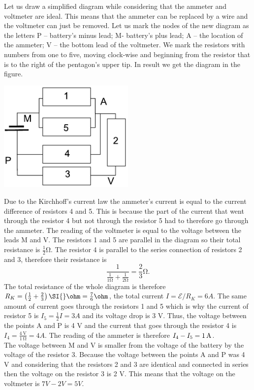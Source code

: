 {\ifEngSolution
Let us draw a simplified diagram while considering that the ammeter and voltmeter are ideal. This means that the ammeter can be replaced by a wire and the voltmeter can just be removed. Let us mark the nodes of the new diagram as the letters P – battery’s minus lead; M- battery’s plus lead; A – the location of the ammeter; V – the bottom lead of the voltmeter. We mark the resistors with numbers from one to five, moving clock-wise and beginning from the resistor that is to the right of the pentagon’s upper tip. In result we get the diagram in the figure.
\begin{center}
	\includegraphics[width=0.5\textwidth]{2017-v3g-06-viisnurk-lah}
\end{center}
Due to the Kirchhoff’s current law the ammeter’s current is equal to the current difference of resistors 4 and 5. This is because the part of the current that went through the resistor 4 but not through the resistor 5 had to therefore go through the ammeter. The reading of the voltmeter is equal to the voltage between the leads M and V. The resistors 1 and 5 are parallel in the diagram so their total resistance is $\frac12 \si{\ohm}$. The resistor 4 is parallel to the series connection of resistors 2 and 3, therefore their resistance is
$$\frac{1}{\frac{1}{1\si{\ohm}}+\frac{1}{2\si{\ohm}}} = \frac 23 \si{\ohm}. $$ 
The total resistance of the whole diagram is therefore $R_K=\left(\frac 12 + 
\frac 23\right)\SI{}\ohm=\frac 76\ohm$, the total current $I=\mathcal 
E/R_K=\SI{6}A$. The same amount of current goes through the resistors 1 and 5 which is why the current of resistor 5 is $I_5=\frac 12 I=\SI{3}A$ and its voltage drop is 3 V. Thus, the voltage between the points A and P is 4 V and the current that goes through the resistor 4 is $I_4=\frac{\SI{4}{\volt}}{\SI{1}{\ohm}}=\SI{4}A$. The reading of the ammeter is therefore $I_4-I_5=\SI 1A$.\\
The voltage between M and V is smaller from the voltage of the battery by the voltage of the resistor 3. Because the voltage between the points A and P was 4 V and considering that the resistors 2 and 3 are identical and connected in series then the voltage on the resistor 3 is 2 V. This means that the voltage on the voltmeter is $\SI{7}V -\SI{2}V= \SI{5}V$.
\fi
}